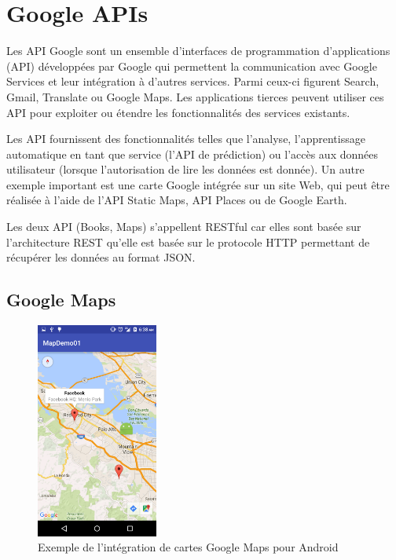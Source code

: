 \section{Google APIs}
Les API Google sont un ensemble d'interfaces de programmation d'applications (API) développées par Google qui permettent la communication avec Google Services et leur intégration à d'autres services. Parmi ceux-ci figurent Search, Gmail, Translate ou Google Maps. Les applications tierces peuvent utiliser ces API pour exploiter ou étendre les fonctionnalités des services existants.

Les API fournissent des fonctionnalités telles que l'analyse, l'apprentissage automatique en tant que service (l'API de prédiction) ou l'accès aux données utilisateur (lorsque l'autorisation de lire les données est donnée). Un autre exemple important est une carte Google intégrée sur un site Web, qui peut être réalisée à l'aide de l'API Static Maps, API Places ou de Google Earth.\cite{noauthor_google_2019}

Les deux API (Books, Maps) s'appellent RESTful car elles sont basée sur l'architecture \gls{REST} qu'elle est basée sur le protocole \acrshort{HTTP} permettant de récupérer les données au format \acrshort{JSON}.

\subsection{Google Maps}

\begin{figure}
	\includegraphics[width=4cm]{Images/chapter3/maps_android_sdk.png}
	\vspace{-20pt}
	\caption{{\footnotesize Exemple de l'intégration de cartes Google Maps pour Android}}
\end{figure}

